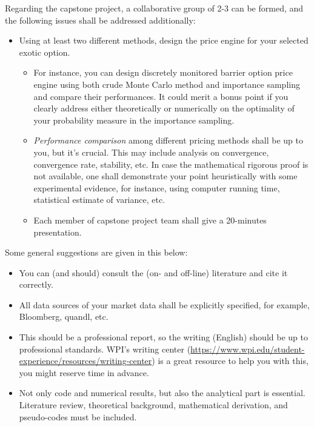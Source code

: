 \documentclass{article}
\begin{document}
Regarding the capstone project, a collaborative group of 2-3 can be formed, and the following issues shall be addressed additionally: 
\begin{itemize}
 
\item Using at least two different methods, 
design the price engine for your selected exotic option. 
\begin{itemize}
 \item  For instance, you can design discretely monitored 
barrier option price engine using both crude Monte Carlo method 
and  importance sampling and compare their performances. 
It could merit a bonus point if you clearly address either theoretically or 
numerically on the optimality of your probability measure in the importance sampling.
\item {\it Performance comparison} among different pricing methods shall be up to you, but it's crucial.
This may include analysis on convergence, convergence rate, stability, etc. 
In case the mathematical rigorous proof is not available, 
 one shall demonstrate your point heuristically with some experimental evidence, 
 for instance, using computer running time, statistical estimate of variance, etc.

\item Each member of capstone project team shall give a 20-minutes presentation.
\end{itemize}

\end{itemize}


Some general suggestions are given in this below:
\begin{itemize}

\item You can (and should)  consult the (on- and off-line) literature and cite it correctly.

\item All data sources of your market data shall be explicitly specified, for example, 
Bloomberg,  quandl, etc.

\item This should be a professional report, so the writing (English) should be up to professional standards. WPI's writing center (\url{https://www.wpi.edu/student-experience/resources/writing-center}) is a great resource to help you with this, you might reserve time in advance. 

\item
Not only code and numerical results, but also the analytical part is essential.
Literature review, theoretical background, 
mathematical derivation, and pseudo-codes must be included. 

\end{itemize}
\end{document}
